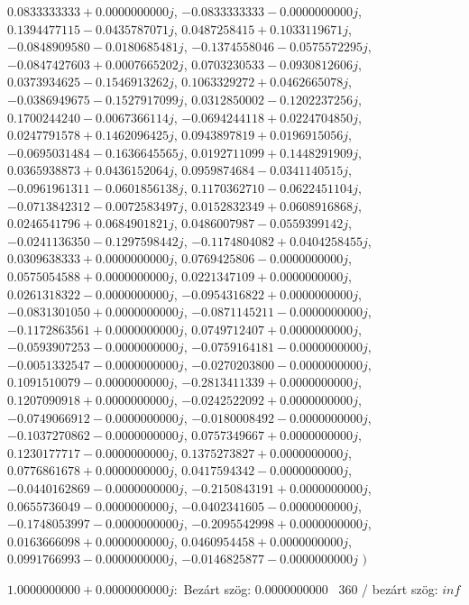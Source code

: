 \documentclass[14pt,a4paper]{article}
\begin{document}
\begin{itemize}
$0.0833333333+0.0000000000j$, $-0.0833333333-0.0000000000j$, $0.1394477115-0.0435787071j$, $0.0487258415+0.1033119671j$, $-0.0848909580-0.0180685481j$, $-0.1374558046-0.0575572295j$, $-0.0847427603+0.0007665202j$, $0.0703230533-0.0930812606j$, $0.0373934625-0.1546913262j$, $0.1063329272+0.0462665078j$, $-0.0386949675-0.1527917099j$, $0.0312850002-0.1202237256j$, $0.1700244240-0.0067366114j$, $-0.0694244118+0.0224704850j$, $0.0247791578+0.1462096425j$, $0.0943897819+0.0196915056j$, $-0.0695031484-0.1636645565j$, $0.0192711099+0.1448291909j$, $0.0365938873+0.0436152064j$, $0.0959874684-0.0341140515j$, $-0.0961961311-0.0601856138j$, $0.1170362710-0.0622451104j$, $-0.0713842312-0.0072583497j$, $0.0152832349+0.0608916868j$, $0.0246541796+0.0684901821j$, $0.0486007987-0.0559399142j$, $-0.0241136350-0.1297598442j$, $-0.1174804082+0.0404258455j$, $0.0309638333+0.0000000000j$, $0.0769425806-0.0000000000j$, $0.0575054588+0.0000000000j$, $0.0221347109+0.0000000000j$, $0.0261318322-0.0000000000j$, $-0.0954316822+0.0000000000j$, $-0.0831301050+0.0000000000j$, $-0.0871145211-0.0000000000j$, $-0.1172863561+0.0000000000j$, $0.0749712407+0.0000000000j$, $-0.0593907253-0.0000000000j$, $-0.0759164181-0.0000000000j$, $-0.0051332547-0.0000000000j$, $-0.0270203800-0.0000000000j$, $0.1091510079-0.0000000000j$, $-0.2813411339+0.0000000000j$, $0.1207090918+0.0000000000j$, $-0.0242522092+0.0000000000j$, $-0.0749066912-0.0000000000j$, $-0.0180008492-0.0000000000j$, $-0.1037270862-0.0000000000j$, $0.0757349667+0.0000000000j$, $0.1230177717-0.0000000000j$, $0.1375273827+0.0000000000j$, $0.0776861678+0.0000000000j$, $0.0417594342-0.0000000000j$, $-0.0440162869-0.0000000000j$, $-0.2150843191+0.0000000000j$, $0.0655736049-0.0000000000j$, $-0.0402341605-0.0000000000j$, $-0.1748053997-0.0000000000j$, $-0.2095542998+0.0000000000j$, $0.0163666098+0.0000000000j$, $0.0460954458+0.0000000000j$, $0.0991766993-0.0000000000j$, $-0.0146825877-0.0000000000j$
$\big)$
\end{itemize}
$1.0000000000+0.0000000000j$:\
Bezárt szög: $0.0000000000$ \
360 / bezárt szög: $inf$\
\end{document}
